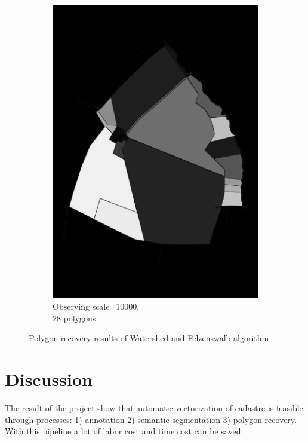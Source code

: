 \documentclass[12pt]{article}
\begin{document}
\begin{figure}[H]
\begin{subfigure}[b]{.3\textwidth}
		\includegraphics[width=1\linewidth]{images/polygon_recovery/felzenswalb2_scale10000_region49.png}  
		\caption{Observing scale=10000, \\ 28 polygons}
	\end{subfigure}
	
	\caption{Polygon recovery results of Watershed and Felzenswalb algorithm}
	\label{fig:watershed2}
\end{figure}




\section{Discussion}
The result of the project show that automatic vectorization of cadastre is feasible through processes: 1) annotation 2) semantic segmentation 3) polygon recovery. With this pipeline a lot of labor cost and time cost can be saved. 
\end{document}
